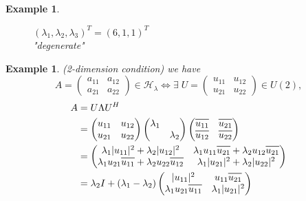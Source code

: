 \documentclass[11pt]{amsart}
\numberwithin{equation}{section}
\theoremstyle{plain}
\newtheorem{eg}[theorem]{Example}
\theoremstyle{plain}
\numberwithin{equation}{section}
\theoremstyle{remark}
\newcommand*\widebar[1]{%
	\hbox{%
		\vbox{%
			\hrule height 0.5pt %
			\kern0.6ex%
			\hbox{%
				\kern 0em%
				\ensuremath{#1}%
				\kern 0em%
			}%
		}%
	}%
}
\begin{document}
\begin{eg}
\begin{figure}[H]
\begin{minipage}[t]{.49\textwidth}
	 		$(\lambda_1,\lambda_2,\lambda_3)^T=(6,1,1)^T$\\"degenerate"
	 	\end{minipage}
	 \end{figure}	
\end{eg}
\begin{eg}(2-dimension condition)
	we have
	$$A= \begin{pmatrix}
	a_{11} & a_{12} \\
	a_{21} & a_{22}
	\end{pmatrix}
	 \in \mathcal{H}_\lambda \Leftrightarrow \exists \;
	 U=\begin{pmatrix}
	 u_{11} & u_{12} \\
	 u_{21} & u_{22}
	 \end{pmatrix}
	 \in U(2),$$
\begin{equation*}
 	\begin{aligned}
 	A&= U\Lambda U^H \\ 	
 	&=\begin{pmatrix}
 	u_{11} & u_{12} \\
 	u_{21} & u_{22}
 	\end{pmatrix}
 	\begin{pmatrix}
 	\lambda_1 &  \\
 	& \lambda_2
 	\end{pmatrix}
 	\begin{pmatrix}
 	\widebar{u_{11}} & \widebar{u_{21}} \\
 	\widebar{u_{12}} & \widebar{u_{22}}
 	\end{pmatrix} \\
 	&=\begin{pmatrix}
 	\lambda_1|u_{11}|^2+\lambda_2 |u_{12}|^2 & \lambda_1  u_{11} \widebar{u_{21}}+\lambda_2 u_{12} \widebar{u_{21}} \\
 	\lambda_1 u_{21} \widebar{u_{11}}+\lambda_2 u_{22} \widebar{u_{12}} & \lambda_1|u_{21}|^2+\lambda_2 |u_{22}|^2
 	\end{pmatrix} \\
 	&=\lambda_2 I + (\lambda_1 - \lambda_2)
 	\begin{pmatrix}
 	|u_{11}|^2 & u_{11} \widebar{u_{21}} \\
 	\lambda_1 u_{21} \widebar{u_{11}} & \lambda_1|u_{21}|^2
 	\end{pmatrix}
 	\end{aligned}
\end{equation*}
	  	\begin{figure}[th]
	\begin{minipage}[t]{.49\textwidth}

\end{minipage}
\end{figure}
\end{eg}
\end{document}
